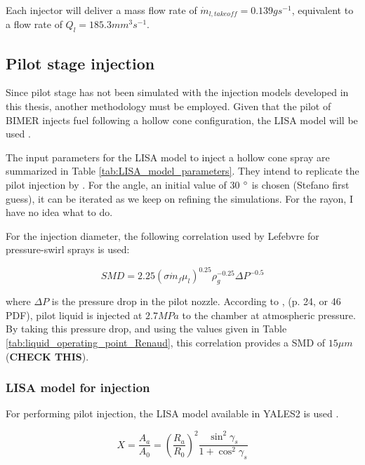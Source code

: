 Each injector will deliver a mass flow rate of $\dot{m}_{l,takeoff} = 0.139 g s^{-1}$, equivalent to a flow rate of $Q_l = 185.3 mm^3 s^{-1}$.


\subsection{Pilot stage injection}

Since pilot stage has not been simulated with the injection models developed in this thesis, another methodology must be employed. Given that the pilot of BIMER injects fuel following a hollow cone configuration, the LISA model will be used . 

The input parameters for the LISA model to inject a hollow cone spray are summarized in Table \ref{tab:LISA_model_parameters}. They intend to replicate the pilot injection by . For the angle, an initial value of 30 $\degree$ is chosen (Stefano first guess), it can be iterated as we keep on refining the simulations. For the rayon, I have no idea what to do.

For the injection diameter, the following correlation used by Lefebvre for pressure-swirl sprays is used:

\begin{equation}
SMD = 2.25 \left( \sigma \dot{m}_f \mu_l \right)^{0.25} \rho_g^{-0.25}  \Delta P^{-0.5}
\end{equation}

where $\Delta P$ is the pressure drop in the pilot nozzle. According to , (p. 24, or 46 PDF), pilot liquid is injected at $2.7 MPa$ to the chamber at atmospheric pressure. By taking this pressure drop, and using the values given in Table \ref{tab:liquid_operating_point_Renaud}, this correlation provides a SMD of $15 \mu m$ (\textbf{CHECK THIS}).

\subsubsection*{LISA model for injection}

For performing pilot injection, the LISA model available in YALES2 is used . 

\begin{equation}
X = \frac{A_a}{A_0} = \left( \frac{R_a}{R_0} \right)^2 \frac{\sin^2 \gamma_s}{1 + \cos^2 \gamma_s}
\end{equation}


